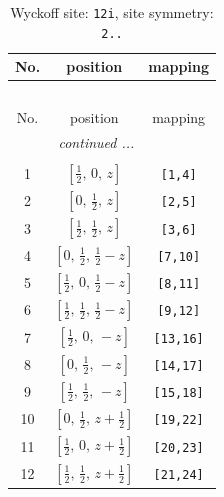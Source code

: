 \documentclass[fleqn,8pt]{jsarticle}
\begin{document}
\begin{longtable}{ccc}
\caption{Wyckoff site: {\tt 12i}, site symmetry: {\tt 2..}}
 \\
 \hline \hline
No. & position & mapping \\ \hline \endfirsthead

\multicolumn{2}{l}{\tablename\ \thetable{}} \\
 \hline \hline
No. & position & mapping \\ \hline \endhead

 \hline \hline
\multicolumn{2}{r}{\footnotesize\it continued ...} \\ \endfoot

 \hline \hline
\multicolumn{2}{r}{} \\ \endlastfoot

1 & $\left[ \frac{1}{2},\, 0,\, z \right]$ & {\tt [1,4]} \\ \hline
2 & $\left[ 0,\, \frac{1}{2},\, z \right]$ & {\tt [2,5]} \\ \hline
3 & $\left[ \frac{1}{2},\, \frac{1}{2},\, z \right]$ & {\tt [3,6]} \\ \hline
4 & $\left[ 0,\, \frac{1}{2},\, \frac{1}{2} - z \right]$ & {\tt [7,10]} \\ \hline
5 & $\left[ \frac{1}{2},\, 0,\, \frac{1}{2} - z \right]$ & {\tt [8,11]} \\ \hline
6 & $\left[ \frac{1}{2},\, \frac{1}{2},\, \frac{1}{2} - z \right]$ & {\tt [9,12]} \\ \hline
7 & $\left[ \frac{1}{2},\, 0,\, - z \right]$ & {\tt [13,16]} \\ \hline
8 & $\left[ 0,\, \frac{1}{2},\, - z \right]$ & {\tt [14,17]} \\ \hline
9 & $\left[ \frac{1}{2},\, \frac{1}{2},\, - z \right]$ & {\tt [15,18]} \\ \hline
10 & $\left[ 0,\, \frac{1}{2},\, z + \frac{1}{2} \right]$ & {\tt [19,22]} \\ \hline
11 & $\left[ \frac{1}{2},\, 0,\, z + \frac{1}{2} \right]$ & {\tt [20,23]} \\ \hline
12 & $\left[ \frac{1}{2},\, \frac{1}{2},\, z + \frac{1}{2} \right]$ & {\tt [21,24]} \\
\end{longtable}
\renewcommand{\arraystretch}{1.2}
\end{document}
